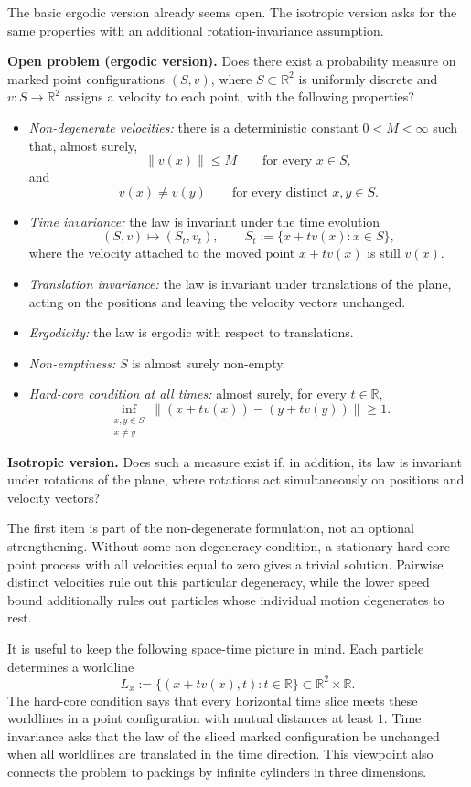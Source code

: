 \documentclass[11pt]{article}
\theoremstyle{remark}
\begin{document}
The basic ergodic version already seems open. The isotropic version asks for the same properties with an additional rotation-invariance assumption.

\medskip
\noindent\textbf{Open problem (ergodic version).}
Does there exist a probability measure on marked point configurations $(S,v)$, where $S\subset\mathbb R^2$ is uniformly discrete and $v:S\to\mathbb R^2$ assigns a velocity to each point, with the following properties?
\begin{itemize}[leftmargin=2em]
\item \emph{Non-degenerate velocities:} there is  a deterministic constant $0<M<\infty$ such that, almost surely,
\[
\|v(x)\|\le M \qquad \text{for every }x\in S,
\]
and
\[
v(x)\ne v(y) \qquad \text{for every distinct }x,y\in S.
\]
\item \emph{Time invariance:} the law is invariant under the time evolution
\[
(S,v)\mapsto (S_t,v_t), \qquad
S_t:=\{x+t v(x):x\in S\},
\]
where the velocity attached to the moved point $x+t v(x)$ is still $v(x)$.
\item \emph{Translation invariance:} the law is invariant under translations of the plane, acting on the positions and leaving the velocity vectors unchanged.
\item \emph{Ergodicity:} the law is ergodic with respect to translations.
\item \emph{Non-emptiness:} $S$ is almost surely non-empty.
\item \emph{Hard-core condition at all times:} almost surely, for every $t\in\mathbb R$,
\[
\inf_{\substack{x,y\in S\\ x\ne y}}
\|(x+t v(x))-(y+t v(y))\|\ge 1 .
\]
\end{itemize}

\noindent\textbf{Isotropic version.}
Does such a measure exist if, in addition, its law is invariant under rotations of the plane, where rotations act simultaneously on positions and velocity vectors? 

The first item is part of the non-degenerate formulation, not an optional strengthening. Without some non-degeneracy condition, a stationary hard-core point process with all velocities equal to zero gives a trivial solution. Pairwise distinct velocities rule out this particular degeneracy, while the lower speed bound additionally rules out particles whose individual motion degenerates to rest.

It is useful to keep the following space-time picture in mind. Each particle determines a worldline
\[
L_x:=\{(x+t v(x),t):t\in\mathbb R\}\subset\mathbb R^2\times\mathbb R .
\]
The hard-core condition says that every horizontal time slice meets these worldlines in a point configuration with mutual distances at least $1$. Time invariance asks that the law of the sliced marked configuration be unchanged when all worldlines are translated in the time direction. This viewpoint also connects the problem to packings by infinite cylinders in three dimensions.
\end{document}
